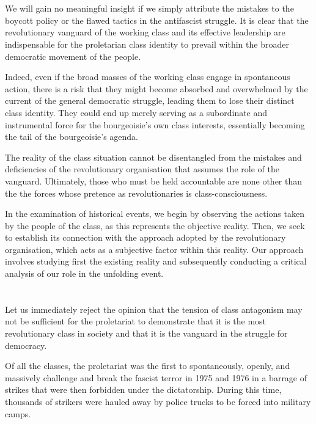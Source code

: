 \section{}
We will gain no meaningful insight
if we simply attribute the mistakes 
to the boycott policy 
or the flawed tactics in the antifascist struggle. 
It is clear that the revolutionary vanguard 
of the working class 
and its effective leadership are indispensable 
for the proletarian class identity to prevail 
within the broader democratic movement of the people.

Indeed, 
even if the broad masses of the working class 
engage in spontaneous action, 
there is a risk that they might 
become absorbed and overwhelmed by 
the current of the general democratic struggle, 
leading them to lose their distinct class identity. 
They could end up merely serving 
as a subordinate and instrumental force 
for the bourgeoisie's own class interests, 
essentially becoming the tail of the bourgeoisie's agenda.

The reality of the class situation 
cannot be disentangled from 
the mistakes and deficiencies 
of the revolutionary organisation 
that assumes the role of the vanguard. 
Ultimately, 
those who must be held accountable are none other than the
the forces whose pretence as revolutionaries is class-consciousness.

In the examination of historical events,
we begin by observing the actions taken by the people of the class,
as this represents the objective reality.
Then, we seek to establish its connection
with the approach adopted by the revolutionary organisation,
which acts as a subjective factor within this reality.
Our approach involves studying first the existing reality 
and subsequently conducting a critical analysis 
of our role in the unfolding event.


\section{}
Let us immediately reject the opinion 
that the tension of class antagonism may not be sufficient for the proletariat 
to demonstrate that it is the most revolutionary class in society 
and that it is the vanguard in the struggle for democracy.

Of all the classes, 
the proletariat was the first to spontaneously, openly, and massively 
challenge and break 
the fascist terror in 1975 and 1976 
in a barrage of strikes that 
were then forbidden under the dictatorship. 
During this time, 
thousands of strikers were 
hauled away by police trucks 
to be forced into military camps.

